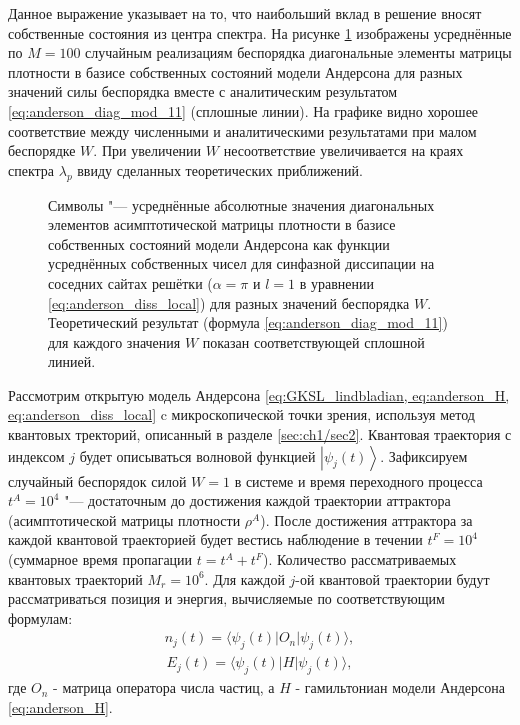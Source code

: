 Данное выражение указывает на то, что наибольший вклад в решение вносят собственные состояния из центра спектра.
На рисунке \cref{fig:anderson_rho_nn_2} изображены усреднённые по \(M=100\) случайным реализациям беспорядка диагональные элементы матрицы плотности в базисе собственных состояний модели Андерсона для разных значений силы беспорядка вместе с аналитическим результатом \cref {eq:anderson_diag_mod_11} (сплошные линии). На графике видно хорошее соответствие между численными и аналитическими результатами при малом беспорядке \(W\). При увеличении \(W\) несоответствие увеличивается на краях спектра \(\lambda_p\) ввиду сделанных теоретических приближений. 
\begin{figure}[ht]
	\caption{
		Символы "--- усреднённые абсолютные значения диагональных элементов асимптотической матрицы плотности в базисе собственных состояний модели Андерсона как функции усреднённых собственных чисел для синфазной диссипации на соседних сайтах решётки (\(\alpha=\pi\) и \(l=1\) в уравнении \cref{eq:anderson_diss_local}) для разных значений беспорядка \(W\). Теоретический результат (формула \cref{eq:anderson_diag_mod_11}) для каждого значения \(W\) показан соответствующей сплошной линией.
	}
	\label{fig:anderson_rho_nn_2}
\end{figure}

Рассмотрим открытую модель Андерсона \cref{eq:GKSL_lindbladian, eq:anderson_H, eq:anderson_diss_local} c микроскопической точки зрения, используя метод квантовых тректорий, описанный в разделе \cref{sec:ch1/sec2}. Квантовая траектория с индексом \(j\) будет описываться волновой функцией \(\left| \psi_j(t) \right\rangle\). Зафиксируем случайный беспорядок  силой \(W=1\) в системе и время переходного процесса \(t^A = 10^4\) "--- достаточным до достижения каждой траектории аттрактора (асимптотической матрицы плотности \(\rho^A\)). После достижения аттрактора за каждой квантовой траекторией будет вестись наблюдение в течении \(t^F = 10^4\) (суммарное время пропагации \(t = t^A + t^F\)). Количество рассматриваемых квантовых траекторий \(M_r=10^6\). Для каждой \(j\)-ой квантовой траектории будут рассматриваться позиция и энергия, вычисляемые по соответствующим формулам:
\begin{equation}
\label{eq:anderson_position}
\begin{gathered}
n_j(t) = \langle \psi_j(t)| O_n | \psi_j(t) \rangle,
\end{gathered}
\end{equation}
\begin{equation}
\label{eq:anderson_energy}
\begin{gathered}
E_j(t) = \langle \psi_j(t)| H | \psi_j(t) \rangle,
\end{gathered}
\end{equation}
где \(O_n\) - матрица оператора числа частиц, а \(H\) - гамильтониан модели Андерсона \cref{eq:anderson_H}.

